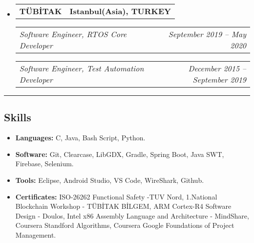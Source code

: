 \documentclass[11pt,letterpaper]{article}
\makeatletter
\newcommand{\headerrow}[2]
{\begin{tabular*}{\linewidth}{l@{\extracolsep{\fill}}r}
#1 &
#2 \\
\end{tabular*}}
\makeatother
\begin{document}
\begin{itemize}[leftmargin=1em]
	\item
	      \headerrow
	      {\textbf{TÜBİTAK}}
	      {\textbf{Istanbul(Asia), TURKEY}}
	      \headerrow
	      {\emph{Software Engineer, RTOS Core Developer}}
	      {\emph{September 2019 -- May 2020}}
	      \headerrow
	      {\emph{Software Engineer, Test Automation Developer}}
	      {\emph{December 2015 -- September 2019}}
	      	      
\end{itemize}

\hrule
\vspace{-1em}
\subsection*{\Large Skills}

\begin{itemize}[leftmargin=1em,noitemsep]
	\item \textbf{Languages:}
	      C, Java, Bash Script, Python.
	\item \textbf{Software:}
	      Git, Clearcase, LibGDX, Gradle, Spring Boot, Java SWT, Firebase, Selenium.
	\item \textbf{Tools:}
	      Eclipse, Android Studio, VS Code, WireShark, Github.
	\item \textbf{Certificates:}
	      ISO-26262 Functional Safety -TUV Nord, 1.National Blockchain Workshop - TÜBİTAK BİLGEM, ARM Cortex-R4 Software Design - Doulos, Intel x86 Assembly Language and Architecture - MindShare, Coursera Standford Algorithms, Coursera Google Foundations of Project Management.
\end{itemize}
\end{document}
